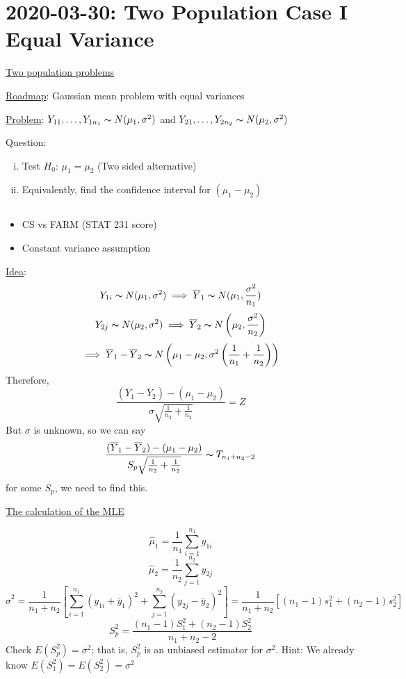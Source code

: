 \section{2020-03-30: Two Population Case I Equal Variance}
\underline{Two population problems}

\underline{Roadmap}: Gaussian mean problem with equal variances

\underline{Problem}: $ Y_{11},\ldots ,Y_{1n_1} \thicksim N(\mu_1,\sigma^2) $ and
$ Y_{21},\ldots ,Y_{2n_2} \thicksim N(\mu_2,\sigma^2) $

Question:
\begin{enumerate}[(i)]
    \item Test $ H_0 $: $ \mu_1=\mu_2 $ (Two sided alternative)
    \item Equivalently, find the confidence interval for $ (\mu_1-\mu_2) $
\end{enumerate}

\begin{exbox}
    \begin{example} $ \; $
        \begin{itemize}
            \item CS vs FARM (STAT 231 score)
            \item Constant variance assumption
        \end{itemize}
    \end{example}
\end{exbox}

\underline{Idea}:
\[ Y_{1i} \thicksim N(\mu_1,\sigma^2)\implies \overline{Y}_1 \thicksim N(\mu_1,\frac{\sigma^2}{n_1} ) \]
\[ Y_{2j} \thicksim N(\mu_2,\sigma^2)\implies \overline{Y}_2 \thicksim N\left( \mu_2,\frac{\sigma^2}{n_2} \right) \]
\[ \implies \overline{Y}_1-\overline{Y}_2
    \thicksim N\left(\mu_1-\mu_2,\sigma^2\left( \frac{1}{n_1} +\frac{1}{n_2} \right)\right) \]
Therefore,
\[ \frac{(\overline{Y}_1-\overline{Y}_2)-(\mu_1-\mu_2)}{\sigma \sqrt{\frac{1}{n_2}+\frac{1}{n_2}}}=Z  \]
But $ \sigma $ is unknown, so we can say
\[ \frac{(\overline{Y}_1-\overline{Y}_2)-(\mu_1-\mu_2)}{S_p\sqrt{\frac{1}{n_2}+\frac{1}{n_2}}}
    \thicksim T_{n_1+n_2-2} \]
for some $ S_p $, we need to find this.

\underline{The calculation of the MLE}

\[ \hat{\mu}_1=\frac{1}{n_1} \sum\limits_{i=1}^{n_1} y_{1i} \]
\[ \hat{\mu}_2=\frac{1}{n_2} \sum\limits_{j=1}^{n_2} y_{2j} \]
\[ \hat{\sigma}^2=\frac{1}{n_1+n_2}\left[ \sum\limits_{i=1}^{n_1}(y_{1i}+\overline{y}_1)^2+ \sum\limits_{j=1}^{n_2}(y_{2j}-\overline{y}_2)^2\right]
    =\frac{1}{n_1+n_2} \left[ (n_1-1)s_1^2+(n_2-1)s_2^2  \right] \]
\[ S_p^2=\frac{(n_1-1)S_1^2+(n_2-1)S_2^2}{n_1+n_2-2} \]
Check $ E(S_p^2)=\sigma^2 $; that is, $ S_p^2 $ is an unbiased estimator
for $ \sigma^2 $. Hint: We already know $ E(S_1^2)=E(S_2^2)=\sigma^2 $

